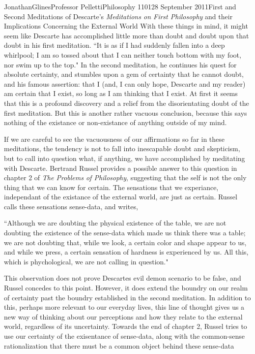 \documentclass[12pt, letterpaper]{article}
\begin{document}
\begin{mla}{Jonathan}{Glines}{Professor Pelletti}{Philosophy 1101}{28 September 2011}{First and Second Meditations of Descarte's \textit{Meditations on First Philosophy} and their Implications Concerning the External World}
With these things in mind, it might seem like Descarte has accomplished little more than doubt and doubt upon that doubt in his first meditation. ``It is as if I had suddenly fallen into a deep whirlpool; I am so tossed about that I can neither touch bottom with my foot, nor swim up to the top." In the second meditation, he continues his quest for absolute certainty, and stumbles upon a gem of certainty that he cannot doubt, and his famous assertion: that I (and, I can only hope, Descarte and my reader) am certain that I exist, so long as I am thinking that I exist. At first it seems that this is a profound discovery and a relief from the disorientating doubt of the first meditation. But this is another rather vacuous conclusion, because this says nothing of the existance or non-existance of anything outside of my mind.

If we are careful to see the vacuousness of our affirmations so far in these meditations, the tendency is not to fall into inescapable doubt and skepticism, but to call into question what, if anything, we have accomplished by meditating with Descarte. Bertrand Russel provides a possible answer to this question in chapter 2 of \textit{The Problems of Philosophy}, suggesting that the self is not the only thing that we can know for certain. The sensations that we experiance, independant of the existance of the external world, are just as certain. Russel calls these sensations sense-data, and writes,
\begin{mlaquote}``Although we are doubting the physical existence of the table, we are not doubting the existence of the sense-data which made us think there was a table; we are not doubting that, while we look, a certain color and shape appear to us, and while we press, a certain sensation of hardness is experienced by us. All this, which is phychological, we are not calling in question."\end{mlaquote}
This observation does not prove Descartes evil demon scenario to be false, and Russel concedes to this point. However, it does extend the boundry on our realm of certainty past the boundry established in the second meditation. In addition to this, perhaps more relevant to our everyday lives, this line of thought gives us a new way of thinking about our perceptions and how they relate to the external world, regardless of its uncertainty. Towards the end of chapter 2, Russel tries to use our certainty of the exisentance of sense-data, along with the common-sense rationalization that there must be a common object behind these sense-data 



%
%
\end{mla}
\end{document}
